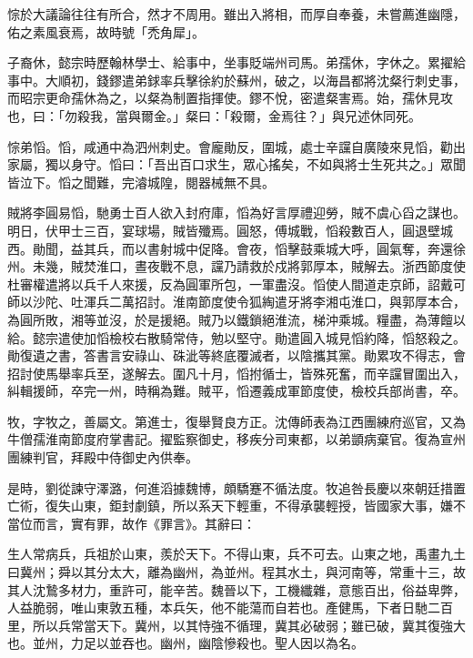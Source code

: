 \begin{pinyinscope}
 悰於大議論往往有所合，然才不周用。雖出入將相，而厚自奉養，未嘗薦進幽隱，佑之素風衰焉，故時號「禿角犀」。



 子裔休，懿宗時歷翰林學士、給事中，坐事貶端州司馬。弟孺休，字休之。累擢給事中。大順初，錢鏐遣弟銶率兵擊徐約於蘇州，破之，以海昌都將沈粲行刺史事，而昭宗更命孺休為之，以粲為制置指揮使。鏐不悅，密遣粲害焉。始，孺休見攻也，曰：「勿殺我，當與爾金。」粲曰：「殺爾，金焉往？」與兄述休同死。



 悰弟慆。慆，咸通中為泗州刺史。會龐勛反，圍城，處士辛讜自廣陵來見慆，勸出家屬，獨以身守。慆曰：「吾出百口求生，眾心搖矣，不如與將士生死共之。」眾聞皆泣下。慆之聞難，完濬城隍，閱器械無不具。



 賊將李圓易慆，馳勇士百人欲入封府庫，慆為好言厚禮迎勞，賊不虞心舀之謀也。明日，伏甲士三百，宴球場，賊皆殲焉。圓怒，傅城戰，慆殺數百人，圓退壁城西。勛聞，益其兵，而以書射城中促降。會夜，慆擊鼓乘城大呼，圓氣奪，奔還徐州。未幾，賊焚淮口，晝夜戰不息，讜乃請救於戍將郭厚本，賊解去。浙西節度使杜審權遣將以兵千人來援，反為圓軍所包，一軍盡沒。慆使人間道走京師，詔戴可師以沙陀、吐渾兵二萬招討。淮南節度使令狐綯遣牙將李湘屯淮口，與郭厚本合，為圓所敗，湘等並沒，於是援絕。賊乃以鐵鎖絕淮流，梯沖乘城。糧盡，為薄饘以給。懿宗遣使加慆檢校右散騎常侍，勉以堅守。勛遣圓入城見慆約降，慆怒殺之。勛復遺之書，答書言安祿山、硃泚等終底覆滅者，以陰攜其黨。勛累攻不得志，會招討使馬舉率兵至，遂解去。圍凡十月，慆拊循士，皆殊死奮，而辛讜冒圍出入，糾輯援師，卒完一州，時稱為難。賊平，慆遷義成軍節度使，檢校兵部尚書，卒。



 牧，字牧之，善屬文。第進士，復舉賢良方正。沈傳師表為江西團練府巡官，又為牛僧孺淮南節度府掌書記。擢監察御史，移疾分司東都，以弟顗病棄官。復為宣州團練判官，拜殿中侍御史內供奉。



 是時，劉從諫守澤潞，何進滔據魏博，頗驕蹇不循法度。牧追咎長慶以來朝廷措置亡術，復失山東，鉅封劇鎮，所以系天下輕重，不得承襲輕授，皆國家大事，嫌不當位而言，實有罪，故作《罪言》。其辭曰：



 生人常病兵，兵祖於山東，羨於天下。不得山東，兵不可去。山東之地，禹畫九土曰冀州；舜以其分太大，離為幽州，為並州。程其水土，與河南等，常重十三，故其人沈鷙多材力，重許可，能辛苦。魏晉以下，工機纖雜，意態百出，俗益卑弊，人益脆弱，唯山東敦五種，本兵矢，他不能蕩而自若也。產健馬，下者日馳二百里，所以兵常當天下。冀州，以其恃強不循理，冀其必破弱；雖已破，冀其復強大也。並州，力足以並吞也。幽州，幽陰慘殺也。聖人因以為名。




\end{pinyinscope}
